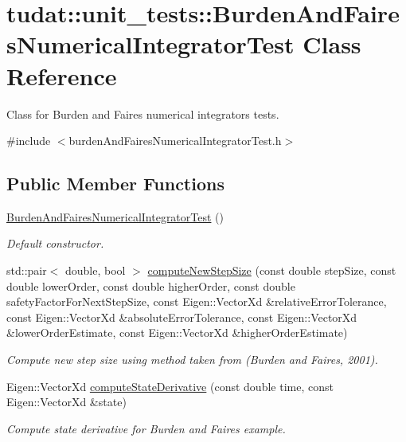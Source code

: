 \hypertarget{classtudat_1_1unit__tests_1_1BurdenAndFairesNumericalIntegratorTest}{}\section{tudat\+:\+:unit\+\_\+tests\+:\+:Burden\+And\+Faires\+Numerical\+Integrator\+Test Class Reference}
\label{classtudat_1_1unit__tests_1_1BurdenAndFairesNumericalIntegratorTest}


Class for Burden and Faires numerical integrators tests.  




{\ttfamily \#include $<$burden\+And\+Faires\+Numerical\+Integrator\+Test.\+h$>$}

\subsection*{Public Member Functions}
\begin{DoxyCompactItemize}
\item 
\hyperlink{classtudat_1_1unit__tests_1_1BurdenAndFairesNumericalIntegratorTest_a1440ed7a1ac678d95f75e034323d66a7}{Burden\+And\+Faires\+Numerical\+Integrator\+Test} ()
\begin{DoxyCompactList}\small\item\em Default constructor. \end{DoxyCompactList}\item 
std\+::pair$<$ double, bool $>$ \hyperlink{classtudat_1_1unit__tests_1_1BurdenAndFairesNumericalIntegratorTest_a798b53f6d7ede7fb9aa068107d4d0c4d}{compute\+New\+Step\+Size} (const double step\+Size, const double lower\+Order, const double higher\+Order, const double safety\+Factor\+For\+Next\+Step\+Size, const Eigen\+::\+Vector\+Xd \&relative\+Error\+Tolerance, const Eigen\+::\+Vector\+Xd \&absolute\+Error\+Tolerance, const Eigen\+::\+Vector\+Xd \&lower\+Order\+Estimate, const Eigen\+::\+Vector\+Xd \&higher\+Order\+Estimate)
\begin{DoxyCompactList}\small\item\em Compute new step size using method taken from (Burden and Faires, 2001). \end{DoxyCompactList}\item 
Eigen\+::\+Vector\+Xd \hyperlink{classtudat_1_1unit__tests_1_1BurdenAndFairesNumericalIntegratorTest_a657962dfec31b21d35f339789be55662}{compute\+State\+Derivative} (const double time, const Eigen\+::\+Vector\+Xd \&state)
\begin{DoxyCompactList}\small\item\em Compute state derivative for Burden and Faires example. \end{DoxyCompactList}\end{DoxyCompactItemize}
